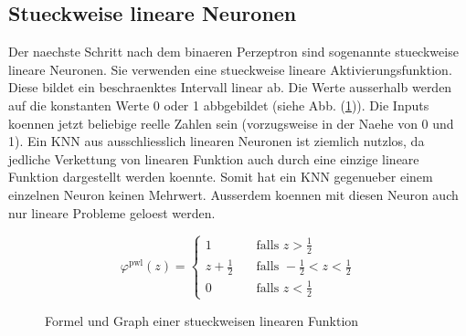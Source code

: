 \subsection{Stueckweise lineare Neuronen}
Der naechste Schritt nach dem binaeren Perzeptron sind sogenannte stueckweise
lineare Neuronen.
Sie verwenden eine stueckweise lineare Aktivierungsfunktion. Diese bildet ein
beschraenktes Intervall linear ab. Die Werte ausserhalb werden auf die
konstanten Werte 0 oder 1 abbgebildet (siehe Abb. (\ref{fig:stueckweiselinear})).
\para{}
Die Inputs koennen jetzt beliebige reelle Zahlen sein (vorzugsweise in der Naehe
von 0 und 1).
Ein KNN aus ausschliesslich linearen Neuronen ist ziemlich nutzlos, da jedliche Verkettung von
linearen Funktion auch durch eine einzige lineare Funktion dargestellt werden
koennte. Somit hat ein KNN gegenueber einem einzelnen Neuron keinen Mehrwert.
Ausserdem koennen mit diesen Neuron auch nur lineare Probleme geloest werden.
\\
\begin{figure}[h!]
  \begin{minipage}[h!]{0.5\textwidth}
    \begin{equation*}
      \varphi^{\text{pwl}}(z) =
      \begin{cases}
        1 & \quad \text{falls } z > \frac{1}{2}\\
        z + \frac{1}{2} & \quad \text{falls } -\frac{1}{2} < z < \frac{1}{2}\\
        0 & \quad \text{falls } z < \frac{1}{2}
      \end{cases}
    \end{equation*}
  \end{minipage}
  \begin{minipage}[h!]{0.5\textwidth}
    \centering
  \end{minipage}
  \caption{Formel und Graph einer stueckweisen linearen Funktion}
  \label{fig:stueckweiselinear}
\end{figure}


